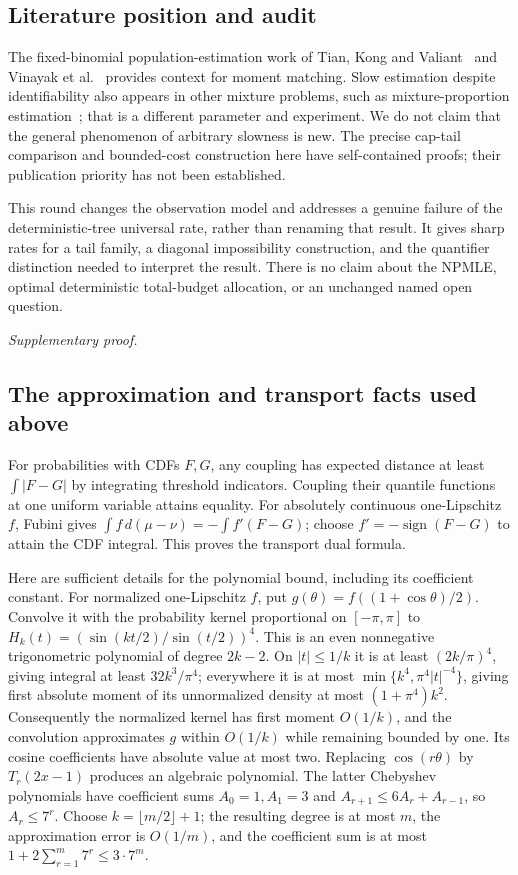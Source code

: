 \documentclass[11pt,a4paper]{article}
\theoremstyle{definition}\newtheorem{definition}[theorem]{Definition}
\theoremstyle{remark}\newtheorem{remark}[theorem]{Remark}
\numberwithin{equation}{section}
\begin{document}
\subsection{Literature position and audit}\label{M03-sec-5}
The fixed-binomial population-estimation work of Tian, Kong and Valiant~\cite{ref014} and Vinayak et al.~\cite{ref015} provides context for moment matching. Slow estimation despite identifiability also appears in other mixture problems, such as mixture-proportion estimation~\cite{ref016}; that is a different parameter and experiment. We do not claim that the general phenomenon of arbitrary slowness is new. The precise cap-tail comparison and bounded-cost construction here have self-contained proofs; their publication priority has not been established.

This round changes the observation model and addresses a genuine failure of the deterministic-tree universal rate, rather than renaming that result. It gives sharp rates for a tail family, a diagonal impossibility construction, and the quantifier distinction needed to interpret the result. There is no claim about the NPMLE, optimal deterministic total-budget allocation, or an unchanged named open question.

\medskip\noindent\textit{Supplementary proof.}\par
\subsection{The approximation and transport facts used above}\label{M03-sec-6}
For probabilities with CDFs $F,G$, any coupling has expected distance at least $\int|F-G|$ by integrating threshold indicators. Coupling their quantile functions at one uniform variable attains equality. For absolutely continuous one-Lipschitz $f$, Fubini gives
$\int f\,d(\mu-\nu)=-\int f'(F-G)$; choose $f'=-\operatorname{sign}(F-G)$ to attain the CDF integral. This proves the transport dual formula.

Here are sufficient details for the polynomial bound, including its coefficient constant. For normalized one-Lipschitz $f$, put $g(\theta)=f((1+\cos\theta)/2)$. Convolve it with the probability kernel proportional on $[-\pi,\pi]$ to
$H_k(t)=(\sin(kt/2)/\sin(t/2))^4$.
This is an even nonnegative trigonometric polynomial of degree $2k-2$. On $|t|\le1/k$ it is at least $(2k/\pi)^4$, giving integral at least $32k^3/\pi^4$; everywhere it is at most $\min\{k^4,\pi^4|t|^{-4}\}$, giving first absolute moment of its unnormalized density at most $(1+\pi^4)k^2$. Consequently the normalized kernel has first moment $O(1/k)$, and the convolution approximates $g$ within $O(1/k)$ while remaining bounded by one. Its cosine coefficients have absolute value at most two. Replacing $\cos(r\theta)$ by $T_r(2x-1)$ produces an algebraic polynomial. The latter Chebyshev polynomials have coefficient sums $A_0=1,A_1=3$ and $A_{r+1}\le6A_r+A_{r-1}$, so $A_r\le7^r$. Choose $k=\lfloor m/2\rfloor+1$; the resulting degree is at most $m$, the approximation error is $O(1/m)$, and the coefficient sum is at most $1+2\sum_{r=1}^m7^r\le3\cdot7^m$.
\end{document}
